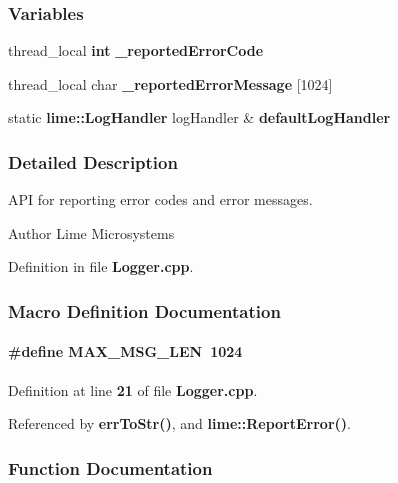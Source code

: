 \subsubsection*{Variables}
\begin{DoxyCompactItemize}
\item 
thread\+\_\+local {\bf int} {\bf \+\_\+reported\+Error\+Code}
\item 
thread\+\_\+local char {\bf \+\_\+reported\+Error\+Message} [1024]
\item 
static {\bf lime\+::\+Log\+Handler} log\+Handler \& {\bf default\+Log\+Handler}
\end{DoxyCompactItemize}


\subsubsection{Detailed Description}
A\+PI for reporting error codes and error messages. 

\begin{DoxyAuthor}{Author}
Lime Microsystems 
\end{DoxyAuthor}


Definition in file {\bf Logger.\+cpp}.



\subsubsection{Macro Definition Documentation}
\paragraph[{M\+A\+X\+\_\+\+M\+S\+G\+\_\+\+L\+EN}]{\setlength{\rightskip}{0pt plus 5cm}\#define M\+A\+X\+\_\+\+M\+S\+G\+\_\+\+L\+EN~1024}\label{Logger_8cpp_a51d90ea93d4b55e086cb490f7478e684}


Definition at line {\bf 21} of file {\bf Logger.\+cpp}.



Referenced by {\bf err\+To\+Str()}, and {\bf lime\+::\+Report\+Error()}.



\subsubsection{Function Documentation}
